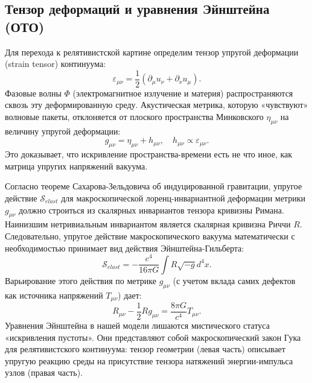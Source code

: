 \documentclass[12pt,a4paper]{article}
\begin{document}
\subsection{Тензор деформаций и уравнения Эйнштейна (ОТО)}
Для перехода к релятивистской картине определим тензор упругой деформации (strain tensor) континуума:
\begin{equation}
	\varepsilon_{\mu\nu} = \frac{1}{2} (\partial_\mu u_\nu + \partial_\nu u_\mu).
\end{equation}
Фазовые волны $\Phi$ (электромагнитное излучение и материя) распространяются сквозь эту деформированную среду. Акустическая метрика, которую «чувствуют» волновые пакеты, отклоняется от плоского пространства Минковского $\eta_{\mu\nu}$ на величину упругой деформации:
\begin{equation}
	g_{\mu\nu} = \eta_{\mu\nu} + h_{\mu\nu}, \quad h_{\mu\nu} \propto \varepsilon_{\mu\nu}.
\end{equation}
Это доказывает, что искривление пространства-времени есть не что иное, как матрица упругих напряжений вакуума. 

Согласно теореме Сахарова-Зельдовича об индуцированной гравитации, упругое действие $\mathcal{S}_{elast}$ для макроскопической лоренц-инвариантной деформации метрики $g_{\mu\nu}$ должно строиться из скалярных инвариантов тензора кривизны Римана. Наинизшим нетривиальным инвариантом является скалярная кривизна Риччи $R$. Следовательно, упругое действие макроскопического вакуума математически с необходимостью принимает вид действия Эйнштейна-Гильберта:
\begin{equation}
	\mathcal{S}_{elast} = -\frac{c^4}{16\pi G} \int R \sqrt{-g} d^4x.
\end{equation}
Варьирование этого действия по метрике $g_{\mu\nu}$ (с учетом вклада самих дефектов как источника напряжений $T_{\mu\nu}$) дает:
\begin{equation}
	R_{\mu\nu} - \frac{1}{2}R g_{\mu\nu} = \frac{8\pi G}{c^4} T_{\mu\nu}.
\end{equation}
Уравнения Эйнштейна в нашей модели лишаются мистического статуса «искривления пустоты». Они представляют собой макроскопический закон Гука для релятивистского континуума: тензор геометрии (левая часть) описывает упругую реакцию среды на присутствие тензора натяжений энергии-импульса узлов (правая часть).
\end{document}
